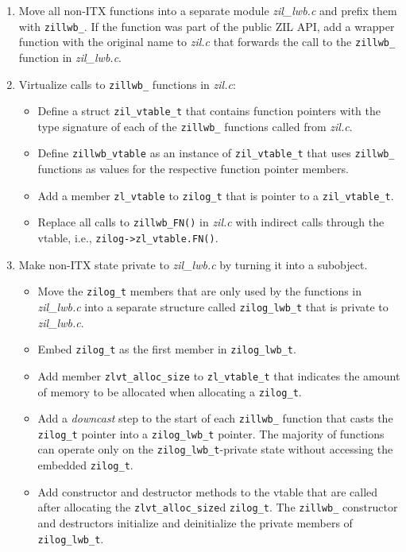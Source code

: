 \documentclass[12pt,a4paper,twoside]{book}
\begin{document}
\begin{enumerate}[noitemsep]
    \item Move all non-ITX functions into a separate module \textit{zil\_lwb.c} and prefix them with \lstinline{zillwb_}.
          If the function was part of the public ZIL API, add a wrapper function with the original name to \textit{zil.c} that forwards the call to the \lstinline{zillwb_} function in \textit{zil\_lwb.c}.
    \item Virtualize calls to \lstinline{zillwb_} functions in \textit{zil.c}:
          \begin{itemize}
              \item Define a struct \lstinline{zil_vtable_t} that contains function pointers with the type signature of each of the \lstinline{zillwb_} functions called from \textit{zil.c}.
              \item Define \lstinline{zillwb_vtable} as an instance of \lstinline{zil_vtable_t} that uses \lstinline{zillwb_} functions as values for the respective function pointer members.
              \item Add a member \lstinline{zl_vtable} to \lstinline{zilog_t} that is pointer to a \lstinline{zil_vtable_t}.
              \item Replace all calls to \lstinline{zillwb_FN()} in \textit{zil.c} with indirect calls through the vtable, i.e., \lstinline{zilog->zl_vtable.FN()}.
          \end{itemize}
    \item Make non-ITX state private to \textit{zil\_lwb.c} by turning it into a subobject.
          \begin{itemize}
              \item Move the \lstinline{zilog_t} members that are only used by the functions in \textit{zil\_lwb.c} into a separate structure called \lstinline{zilog_lwb_t} that is private to \textit{zil\_lwb.c}.
              \item Embed \lstinline{zilog_t} as the first member in \lstinline{zilog_lwb_t}.
              \item Add member \lstinline{zlvt_alloc_size} to \lstinline{zl_vtable_t} that indicates the amount of memory to be allocated when allocating a \lstinline{zilog_t}.
              \item Add a \textit{downcast} step to the start of each \lstinline{zillwb_} function that casts the \lstinline{zilog_t} pointer into a \lstinline{zilog_lwb_t} pointer.
                The majority of functions can operate only on the \lstinline{zilog_lwb_t}-private state without accessing the embedded \lstinline{zilog_t}.
              \item Add constructor and destructor methods to the vtable that are called after allocating the \lstinline{zlvt_alloc_size}d \lstinline{zilog_t}.
                The \lstinline{zillwb_} constructor and destructors initialize and deinitialize the private members of \lstinline{zilog_lwb_t}.
          \end{itemize}
\end{enumerate}
\end{document}
